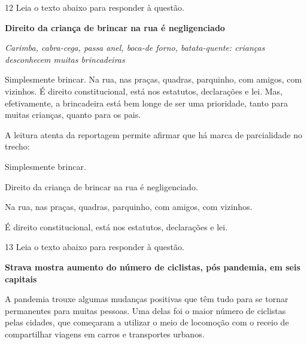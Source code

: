 \num{12} Leia o texto abaixo para responder à questão. 

\begin{myquote}

\textbf{Direito da criança de brincar na rua é negligenciado}

\emph{Carimba, cabra-cega, passa anel, boca-de forno, batata-quente:
crianças desconhecem muitas brincadeiras}

Simplesmente brincar. Na rua, nas praças, quadras, parquinho, com
amigos, com vizinhos. É direito constitucional, está nos estatutos,
declarações e lei. Mas, efetivamente, a brincadeira está bem longe de
ser uma prioridade, tanto para muitas crianças, quanto para os pais.

\end{myquote}


A leitura atenta da reportagem permite afirmar que há marca de parcialidade
no trecho:

\begin{escolha}
  
    \item Simplesmente brincar.
  
    \item Direito da criança de brincar na rua é negligenciado.
  
    \item Na rua, nas praças, quadras, parquinho, com amigos, com vizinhos.
  
    \item É direito constitucional, está nos estatutos, declarações e lei.

\end{escolha}

\num{13} Leia o texto abaixo para responder à questão. 

\begin{myquote}

\textbf{Strava mostra aumento do número de ciclistas, pós pandemia, em
seis capitais}

A pandemia trouxe algumas mudanças positivas que têm tudo para se tornar
permanentes para muitas pessoas. Uma delas foi o maior número de
ciclistas pelas cidades, que começaram a utilizar o meio de locomoção
com o receio de compartilhar viagens em carros e transportes urbanos.

\end{myquote}

